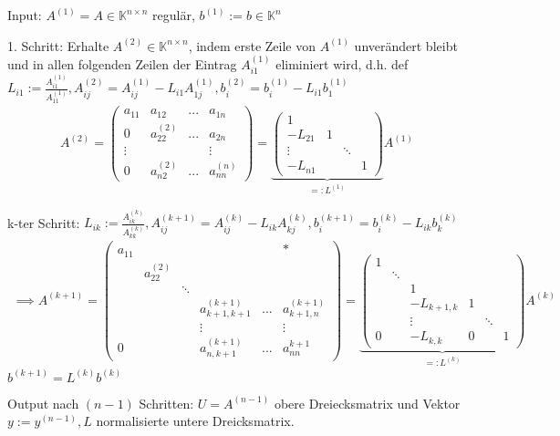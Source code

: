 \begin{algorithm}
	Input: $A^{(1)} = A \in \mathbb{K}^{n \times n}$ regulär, $b^{(1)} := b \in \mathbb{K}^n$
	
	1. Schritt: Erhalte $A^{(2)} \in \mathbb{K}^{n\times n}$, indem erste Zeile von $A^{(1)}$ unverändert bleibt und in allen folgenden Zeilen der Eintrag $A_{i1}^{(1)}$ eliminiert wird, d.h. def $L_{i1} := \frac{A_{i1}^{(1)}}{A_{11}^{(1)}}, A_{ij}^{(2)} = A_{ij}^{(1)} - L_{i1} A_{1j}^{(1)}, b_i^{(2)} = b_i^{(1)} - L_{i1}b_1^{(1)}$
	\begin{align*}
		A^{(2)} = \left(\begin{matrix}
			a_{11} & a_{12} & ... & a_{1n}\\
			0 & a_{22}^{(2)} & ... & a_{2n}\\
			\vdots & & & \vdots\\
			0 & a_{n2}^{(2)} & ... & a_{nn}^{(n)}
		\end{matrix}\right) = \underbrace{\left(\begin{matrix}
			1 & & & \\
			-L_{21} & 1 & &\\
			\vdots & & \ddots &\\
			-L_{n1} & & & 1
		\end{matrix}\right)}_{=:L^{(1)}} A^{(1)}
	\end{align*}
	
	k-ter Schritt: $L_{ik} := \frac{A_{ik}^{(k)}}{A_{kk}^{(k)}}, A_{ij}^{(k+1)} = A_{ij}^{(k)} - L_{ik} A_{kj}^{(k)}, b_i^{(k+1)} = b_i^{(k)} - L_{ik}b_k^{(k)}$
	\begin{align*}
		\implies A^{(k+1)} = \left(\begin{matrix}
			a_{11} &              &        &                     &     &*\\
			       & a_{22}^{(2)} &        & \\
			       &              & \ddots & \\
			       &              &        & a_{k+1,k+1}^{(k+1)} & ... & a_{k+1, n}^{(k+1)}\\
			       &              &        & \vdots              &     & \vdots\\
			0      &              &        & a_{n,k+1}^{(k+1)}   & ... & a_{nn}^{k+1}
		\end{matrix}\right) = \underbrace{\left(\begin{matrix}
				1 &        &          &\\
				  & \ddots &          &\\
				  &        & 1        &\\
				  &        &-L_{k+1,k}& 1\\
				  &        & \vdots   & &  \ddots \\
				0 &        &-L_{k,k}  & 0  & & 1 
			\end{matrix}\right)}_{=:L^{(k)}} A^{(k)}
	\end{align*}
	$b^{(k+1)} = L^{(k)}b^{(k)}$
	
	Output nach $(n-1)$ Schritten: $U = A^{(n-1)}$ obere Dreiecksmatrix und Vektor $y := y^{(n-1)}, L$ normalisierte untere Dreicksmatrix.
\end{algorithm}

